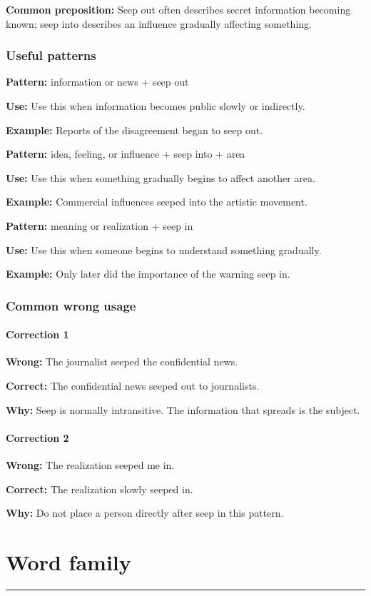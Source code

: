 \documentclass[11pt]{article}
\newcommand{\sectionrule}{\par\vspace{-0.5em}\noindent\textcolor{Accent}{\rule{\linewidth}{0.6pt}}\par}
\begin{document}
\textbf{Common preposition:} Seep out often describes secret information becoming known; seep into describes an influence gradually affecting something.

\subsubsection{Useful patterns}
\textbf{Pattern:} information or news + seep out

\textbf{Use:} Use this when information becomes public slowly or indirectly.

\textbf{Example:} Reports of the disagreement began to seep out.

\textbf{Pattern:} idea, feeling, or influence + seep into + area

\textbf{Use:} Use this when something gradually begins to affect another area.

\textbf{Example:} Commercial influences seeped into the artistic movement.

\textbf{Pattern:} meaning or realization + seep in

\textbf{Use:} Use this when someone begins to understand something gradually.

\textbf{Example:} Only later did the importance of the warning seep in.

\subsubsection{Common wrong usage}
\paragraph{Correction 1}
\textbf{Wrong:} The journalist seeped the confidential news.

\textbf{Correct:} The confidential news seeped out to journalists.

\textbf{Why:} Seep is normally intransitive. The information that spreads is the subject.

\paragraph{Correction 2}
\textbf{Wrong:} The realization seeped me in.

\textbf{Correct:} The realization slowly seeped in.

\textbf{Why:} Do not place a person directly after seep in this pattern.

\section{Word family}
\sectionrule
\end{document}
